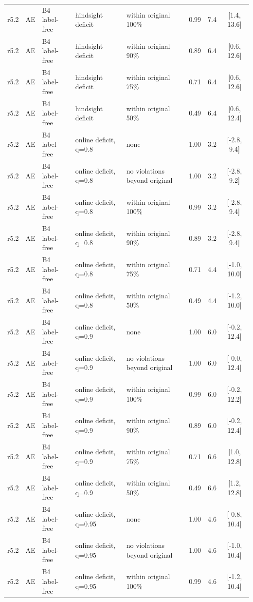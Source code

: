\documentclass[10pt,onecolumn,letterpaper]{article}
\begin{document}
\begin{longtable}{lllp{4.2cm}p{3.4cm}ccc}
r5.2 & AE & B4 label-free & hindsight deficit & within original 100\% & 0.99 & 7.4 & [1.4, 13.6] \\
r5.2 & AE & B4 label-free & hindsight deficit & within original 90\% & 0.89 & 6.4 & [0.6, 12.6] \\
r5.2 & AE & B4 label-free & hindsight deficit & within original 75\% & 0.71 & 6.4 & [0.6, 12.6] \\
r5.2 & AE & B4 label-free & hindsight deficit & within original 50\% & 0.49 & 6.4 & [0.6, 12.4] \\
r5.2 & AE & B4 label-free & online deficit, q=0.8 & none & 1.00 & 3.2 & [-2.8, 9.4] \\
r5.2 & AE & B4 label-free & online deficit, q=0.8 & no violations beyond original & 1.00 & 3.2 & [-2.8, 9.2] \\
r5.2 & AE & B4 label-free & online deficit, q=0.8 & within original 100\% & 0.99 & 3.2 & [-2.8, 9.4] \\
r5.2 & AE & B4 label-free & online deficit, q=0.8 & within original 90\% & 0.89 & 3.2 & [-2.8, 9.4] \\
r5.2 & AE & B4 label-free & online deficit, q=0.8 & within original 75\% & 0.71 & 4.4 & [-1.0, 10.0] \\
r5.2 & AE & B4 label-free & online deficit, q=0.8 & within original 50\% & 0.49 & 4.4 & [-1.2, 10.0] \\
r5.2 & AE & B4 label-free & online deficit, q=0.9 & none & 1.00 & 6.0 & [-0.2, 12.4] \\
r5.2 & AE & B4 label-free & online deficit, q=0.9 & no violations beyond original & 1.00 & 6.0 & [-0.0, 12.4] \\
r5.2 & AE & B4 label-free & online deficit, q=0.9 & within original 100\% & 0.99 & 6.0 & [-0.2, 12.2] \\
r5.2 & AE & B4 label-free & online deficit, q=0.9 & within original 90\% & 0.89 & 6.0 & [-0.2, 12.4] \\
r5.2 & AE & B4 label-free & online deficit, q=0.9 & within original 75\% & 0.71 & 6.6 & [1.0, 12.8] \\
r5.2 & AE & B4 label-free & online deficit, q=0.9 & within original 50\% & 0.49 & 6.6 & [1.2, 12.8] \\
r5.2 & AE & B4 label-free & online deficit, q=0.95 & none & 1.00 & 4.6 & [-0.8, 10.4] \\
r5.2 & AE & B4 label-free & online deficit, q=0.95 & no violations beyond original & 1.00 & 4.6 & [-1.0, 10.4] \\
r5.2 & AE & B4 label-free & online deficit, q=0.95 & within original 100\% & 0.99 & 4.6 & [-1.2, 10.4] \\

\end{longtable}
\end{document}
